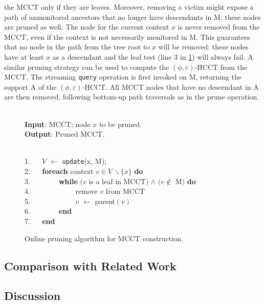 \noindent
\fi
the MCCT only if they are leaves. Moreover, removing a victim might expose a path of unmonitored ancestors that no longer have descendants in M: these nodes are pruned as well. The node for the current context $x$ is never removed from the MCCT, even if the context is not necessarily monitored in M. This guarantees that no node in the path from the tree root to $x$ will be removed: these nodes have at least $x$ as a descendant and the leaf test (line 3 in \myalgorithm\ref{alg:hcct-update}) will always fail.
A similar pruning strategy can be used to compute the $(\phi,\varepsilon)$-HCCT from the MCCT. The streaming {\tt query} operation is first invoked on M, returning the support A of the $(\phi,\varepsilon)$-HCCT. All MCCT nodes that have no descendant in A are then removed, following bottom-up path traversals as in the prune operation.

\ifx\noauthorea\undefined
\begin{figure}[ht]
\begin{small}
\begin{minipage}{0.9\textwidth}
\hrulefill\\
\textbf{Input}: {MCCT; node $x$ to be pruned.}\\
\textbf{Output}: {Pruned MCCT.}

\vspace{-1mm}
\hrulefill\\
1. ~~ $V$ $\gets$ {\tt update}(x, M);\\
2. ~~ \textbf{foreach} context $v\in V\,\backslash \{x\}$ \textbf{do}\\
3. ~~ ~~~~ \textbf{while} $(v$ is a leaf in MCCT$)$ $\wedge$ $(v\not\in$ M$)$ \textbf{do}\\
4. ~~ ~~~~ ~~~~ remove $v$ from MCCT\\
5. ~~ ~~~~ ~~~~ $v$ $\gets$ parent$(v)$\\
6. ~~ ~~~~ \textbf{end}\\
7. ~~ \textbf{end}

\vspace{-1mm}
\hrulefill
\vspace{-2mm}
\end{minipage}
\end{small}
\caption{\label{alg:hcct-update} Online pruning algorithm for MCCT construction.}
\end{figure}
\fi



\subsection{Comparison with Related Work}

\subsection{Discussion}

